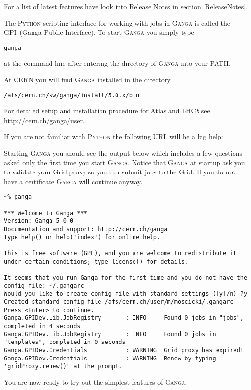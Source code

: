 \documentclass{howto}
\def\ganga {\textsc{Ganga}\xspace}
\def\python {\textsc{Python}\xspace}
\def\lhcb {LHC{\em b\/}\xspace}
\def\Atlas {Atlas\xspace}
\begin{document}
For a list of latest features  have look into Release Notes in section
\ref{ReleaseNotes}.

The \python scripting interface for working with jobs in \ganga is called the
GPI~(Ganga Public Interface). To start \ganga you simply type
\begin{verbatim}
ganga
\end{verbatim}
at the command line after entering the directory of \ganga into your PATH.

At CERN you will find \ganga installed in the directory
\begin{verbatim}
/afs/cern.ch/sw/ganga/install/5.0.x/bin
\end{verbatim}

For detailed setup and installation procedure for \Atlas and \lhcb see \url{http://cern.ch/ganga/user}.

\begin{seealso}
  If you are not familiar with \python the following URL will be a big help:
\end{seealso}

Starting \ganga you should see the output below which includes a few questions
asked only the first time you start \ganga. Notice that \ganga at startup
ask you to validate your Grid proxy so you can submit jobs to the Grid. If you
do not have a certificate \ganga will continue anyway.
\begin{verbatim}
~% ganga

*** Welcome to Ganga ***
Version: Ganga-5-0-0
Documentation and support: http://cern.ch/ganga
Type help() or help('index') for online help.

This is free software (GPL), and you are welcome to redistribute it
under certain conditions; type license() for details.

It seems that you run Ganga for the first time and you do not have the config file: ~/.gangarc
Would you like to create config file with standard settings ([y]/n) ?y
Created standard config file /afs/cern.ch/user/m/moscicki/.gangarc
Press <Enter> to continue.
Ganga.GPIDev.Lib.JobRegistry       : INFO     Found 0 jobs in "jobs", completed in 0 seconds
Ganga.GPIDev.Lib.JobRegistry       : INFO     Found 0 jobs in "templates", completed in 0 seconds
Ganga.GPIDev.Credentials           : WARNING  Grid proxy has expired!
Ganga.GPIDev.Credentials           : WARNING  Renew by typing 'gridProxy.renew()' at the prompt.

\end{verbatim}
You are now ready to try out the simplest features of \ganga.
\end{document}
